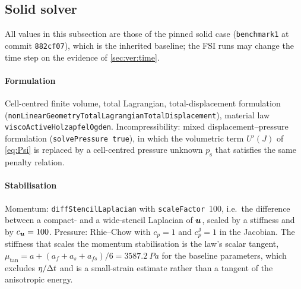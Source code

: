 \subsection{Solid solver}\label{sec:methods:solid}
All values in this subsection are those of the pinned solid case
(\texttt{benchmark1} at commit \texttt{882cf07}), which is the inherited
baseline; the FSI runs may change the time step on the evidence of
\cref{sec:ver:time}.

\paragraph{Formulation} Cell-centred finite volume, total Lagrangian,
total-displacement formulation
(\texttt{nonLinearGeometryTotalLagrangianTotalDisplacement}), material law
\texttt{viscoActiveHolzapfelOgden}. Incompressibility: mixed
displacement--pressure formulation (\texttt{solvePressure true}), in which
the volumetric term $U'(J)$ of \cref{eq:Psi} is replaced by a cell-centred
pressure unknown $p_{\mathrm s}$ that satisfies the same penalty relation.

\paragraph{Stabilisation} Momentum: \texttt{diffStencilLaplacian} with
\texttt{scaleFactor}~100, i.e.\ the difference between a compact- and a
wide-stencil Laplacian of $\bm{u}$, scaled by a stiffness and by $c_{\bm{u}}=100$.
Pressure: Rhie--Chow with $c_p=1$ and $c_p^{\mathrm J}=1$ in the Jacobian.
The stiffness that scales the momentum stabilisation is the law's scalar
tangent, $\mu_{\mathrm{tan}} = a+(a_f+a_s+a_{fs})/6 = \SI{3587.2}{Pa}$ for the
baseline parameters, which excludes $\eta/\Delta t$ and is a small-strain
estimate rather than a tangent of the anisotropic energy.

